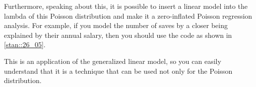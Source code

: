 \documentclass{ltjsbook}
\begin{document}
Furthermore, speaking about this, it is possible to insert a linear model into the lambda of this Poisson distribution and make it a zero-inflated Poisson regression analysis.
For example, if you model the number of saves by a closer being explained by their annual salary, then you should use the code as shown in \ref{stan::26_05}.

This is an application of the generalized linear model, so you can easily understand that it is a technique that can be used not only for the Poisson distribution.
\end{document}
